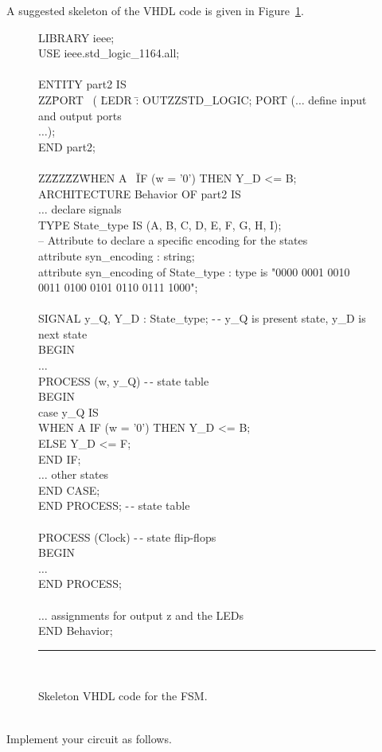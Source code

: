 \documentclass[epsfig,10pt,fullpage]{article}
\begin{document}
A suggested skeleton of the VHDL code is given in Figure~\ref{fig:skeleton_code}.

\begin{figure}[H]
\begin{center}
\begin{tabbing}
LIBRARY ieee;\\
USE ieee.std\_logic\_1164.all;\\
~\\
ENTITY part2 IS\\
ZZ\=PORT ~( \=LEDR \=: OUTZZ\=STD\_LOGIC;\kill
\>PORT (\>$\ldots$ define input and output ports\\
\>\>$\ldots$);\\
END part2;\\
~\\
ZZ\=ZZ\=ZZ\=WHEN A ~\=IF (w = '0') THEN Y\_D <= B;\kill
ARCHITECTURE Behavior OF part2 IS\\
\>$\ldots$ declare signals\\
\>TYPE State\_type IS (A, B, C, D, E, F, G, H, I);\\
\>-- Attribute to declare a specific encoding for the states\\
\>attribute syn\_encoding : string;\\
\>attribute syn\_encoding of State\_type : type is "0000 0001 0010 0011 0100 0101 0110 0111 1000";\\
~\\
\>SIGNAL y\_Q, Y\_D : State\_type; -$\,$- y\_Q is present state, y\_D is next state\\
BEGIN\\
\>$\ldots$ \\
\>PROCESS (w, y\_Q) -$\,$- state table\\
\>BEGIN\\
\>\>case y\_Q IS\\
\>\>\>WHEN A \>IF (w = '0') THEN Y\_D <= B;\\
\>\>\>\>ELSE Y\_D <= F;\\
\>\>\>\>END IF;\\
\>\>\>$\ldots$ other states\\
\>\>END CASE;\\
\>END PROCESS; -$\,$- state table\\
~\\
\>PROCESS (Clock) -$\,$- state flip-flops\\
\>BEGIN\\
\>\>$\ldots$ \\
\>END PROCESS;\\
~\\
\>$\ldots$ assignments for output z and the LEDs\\
END Behavior;
~\rule{5.0in}{0in}\\
\end{tabbing}
\end{center}
\caption{Skeleton VHDL code for the FSM.}
\label{fig:skeleton_code}
\end{figure}
~\\
Implement your circuit as follows.
\end{document}
